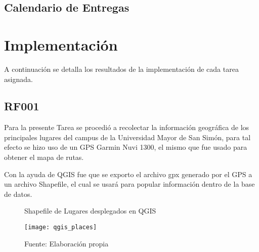     


  \subsection{Calendario de Entregas}
  \label{subs:schedule_1}

    


  \section{Implementación}
  \label{sec:implementacion_iteracion_1}

  A continuación se detalla los resultados de la implementación de cada tarea asignada.

\subsection{RF001}
\label{sub:RF001}


Para la presente Tarea se procedió a recolectar la información geográfica de los principales lugares del campus de la Universidad Mayor de San Simón, para tal efecto se hizo uso
de un GPS Garmin Nuvi 1300, el mismo que fue usado  para obtener el mapa de rutas.

Con la ayuda de QGIS fue que se exporto el archivo gpx generado por el GPS a un archivo Shapefile, el cual se usará para popular información dentro de la base de datos.

\begin{figure}[H]
  \begin{center}
    \caption{Shapefile de Lugares desplegados en QGIS}
    \label{fig:qgis_places}
    \texttt{[image: qgis\_places]}
    \caption*{Fuente: Elaboración propia}
  \end{center}
\end{figure}
